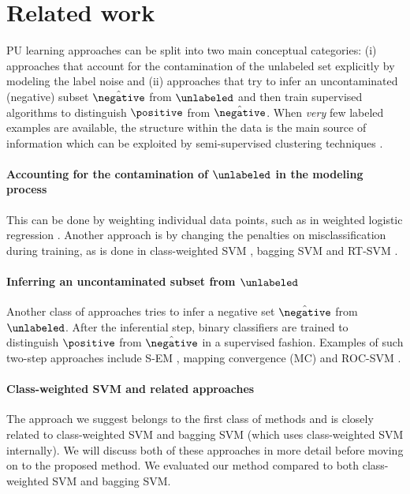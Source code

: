 
\section{Related work}
PU learning approaches can be split into two main conceptual categories: (i) approaches that account for the contamination of the unlabeled set explicitly by modeling the label noise and (ii) approaches that try to infer an uncontaminated (negative) subset $\hat{\negative}$ from $\unlabeled$ and then train supervised algorithms to distinguish $\positive$ from $\hat{\negative}$. When \emph{very} few labeled examples are available, the structure within the data is the main source of information which can be exploited by semi-supervised clustering techniques \citep{bksc2}. 

\paragraph{Accounting for the contamination of $\unlabeled$ in the modeling process}
This can be done by weighting individual data points, such as in weighted logistic regression \citep{Elkan:2008:LCO:1401890.1401920,Lee03learningwith}. Another approach is by changing the penalties on misclassification during training, as is done in class-weighted SVM \citep{Liu:2003:BTC:951949.952139}, bagging SVM \citep{MORDELET-2010-523336} and RT-SVM \citep{Liu:2005:PSC:2138033.2138052}. 

\paragraph{Inferring an uncontaminated subset from $\unlabeled$}
Another class of approaches tries to infer a negative set $\hat{\negative}$ from $\unlabeled$. After the inferential step, binary classifiers are trained to distinguish $\positive$ from $\hat{\negative}$ in a supervised fashion. Examples of such two-step approaches include S-EM \citep{liu02partially}, mapping convergence (MC) \citep{Yu:2005:SCM:1108759.1108762} and ROC-SVM \citep{Li03learningto}.

\paragraph{Class-weighted SVM and related approaches} The approach we suggest belongs to the first class of methods and is closely related to class-weighted SVM and bagging SVM (which uses class-weighted SVM internally). We will discuss both of these approaches in more detail before moving on to the proposed method. We evaluated our method compared to both class-weighted SVM and bagging SVM.



